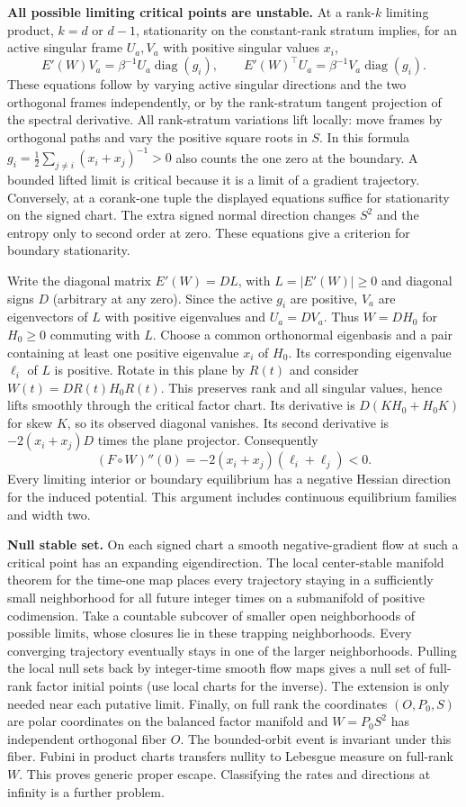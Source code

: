 \documentclass[10pt]{article}
\begin{document}
\textbf{All possible limiting critical points are unstable.} At a rank-$k$ limiting product, $k=d$ or $d-1$, stationarity on the constant-rank stratum implies, for an active singular frame $U_a,V_a$ with positive singular values $x_i$,
\[
 E'(W)V_a=\beta^{-1}U_a\operatorname{diag}(g_i),\qquad
 E'(W)^\top U_a=\beta^{-1}V_a\operatorname{diag}(g_i).
\]
These equations follow by varying active singular directions and the two orthogonal frames independently, or by the rank-stratum tangent projection of the spectral derivative. All rank-stratum variations lift locally: move frames by orthogonal paths and vary the positive square roots in $S$. In this formula $g_i=\frac12\sum_{j\ne i}(x_i+x_j)^{-1}>0$ also counts the one zero at the boundary. A bounded lifted limit is critical because it is a limit of a gradient trajectory. Conversely, at a corank-one tuple the displayed equations suffice for stationarity on the signed chart. The extra signed normal direction changes $S^2$ and the entropy only to second order at zero. These equations give a criterion for boundary stationarity.

Write the diagonal matrix $E'(W)=DL$, with $L=|E'(W)|\ge0$ and diagonal signs $D$ (arbitrary at any zero). Since the active $g_i$ are positive, $V_a$ are eigenvectors of $L$ with positive eigenvalues and $U_a=DV_a$. Thus $W=DH_0$ for $H_0\ge0$ commuting with $L$. Choose a common orthonormal eigenbasis and a pair containing at least one positive eigenvalue $x_i$ of $H_0$. Its corresponding eigenvalue $\ell_i$ of $L$ is positive. Rotate in this plane by $R(t)$ and consider $W(t)=D R(t)H_0 R(t)$. This preserves rank and all singular values, hence lifts smoothly through the critical factor chart. Its derivative is $D(KH_0+H_0K)$ for skew $K$, so its observed diagonal vanishes. Its second derivative is $-2(x_i+x_j)D$ times the plane projector. Consequently
\[
 (F\circ W)''(0)=-2(x_i+x_j)(\ell_i+\ell_j)<0.
\]
Every limiting interior or boundary equilibrium has a negative Hessian direction for the induced potential. This argument includes continuous equilibrium families and width two.

\textbf{Null stable set.} On each signed chart a smooth negative-gradient flow at such a critical point has an expanding eigendirection. The local center-stable manifold theorem for the time-one map places every trajectory staying in a sufficiently small neighborhood for all future integer times on a submanifold of positive codimension. Take a countable subcover of smaller open neighborhoods of possible limits, whose closures lie in these trapping neighborhoods. Every converging trajectory eventually stays in one of the larger neighborhoods. Pulling the local null sets back by integer-time smooth flow maps gives a null set of full-rank factor initial points (use local charts for the inverse). The extension is only needed near each putative limit. Finally, on full rank the coordinates $(O,P_0,S)$ are polar coordinates on the balanced factor manifold and $W=P_0S^2$ has independent orthogonal fiber $O$. The bounded-orbit event is invariant under this fiber. Fubini in product charts transfers nullity to Lebesgue measure on full-rank $W$. This proves generic proper escape. Classifying the rates and directions at infinity is a further problem.
\end{document}
